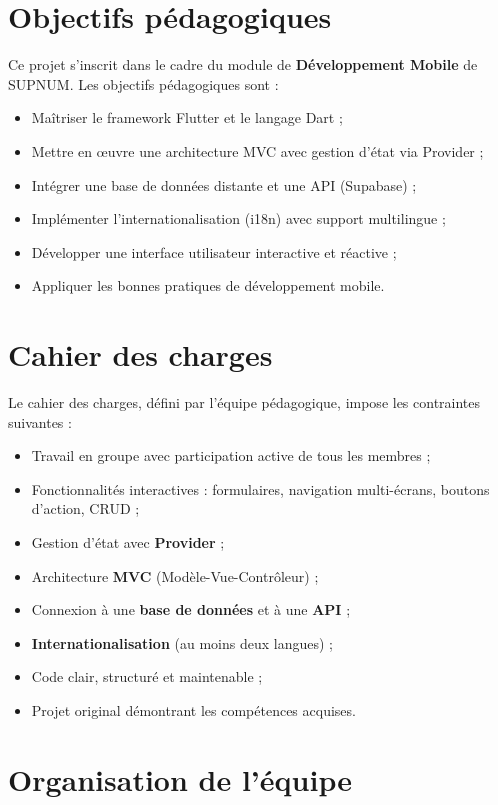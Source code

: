 \documentclass[12pt,a4paper]{report}
\begin{document}
\section{Objectifs pédagogiques}

Ce projet s'inscrit dans le cadre du module de \textbf{Développement Mobile} de SUPNUM. Les objectifs pédagogiques sont :
\begin{itemize}
    \item Maîtriser le framework Flutter et le langage Dart ;
    \item Mettre en œuvre une architecture MVC avec gestion d'état via Provider ;
    \item Intégrer une base de données distante et une API (Supabase) ;
    \item Implémenter l'internationalisation (i18n) avec support multilingue ;
    \item Développer une interface utilisateur interactive et réactive ;
    \item Appliquer les bonnes pratiques de développement mobile.
\end{itemize}

\section{Cahier des charges}

Le cahier des charges, défini par l'équipe pédagogique, impose les contraintes suivantes :
\begin{itemize}
    \item Travail en groupe avec participation active de tous les membres ;
    \item Fonctionnalités interactives : formulaires, navigation multi-écrans, boutons d'action, CRUD ;
    \item Gestion d'état avec \textbf{Provider} ;
    \item Architecture \textbf{MVC} (Modèle-Vue-Contrôleur) ;
    \item Connexion à une \textbf{base de données} et à une \textbf{API} ;
    \item \textbf{Internationalisation} (au moins deux langues) ;
    \item Code clair, structuré et maintenable ;
    \item Projet original démontrant les compétences acquises.
\end{itemize}

\section{Organisation de l'équipe}
\end{document}
